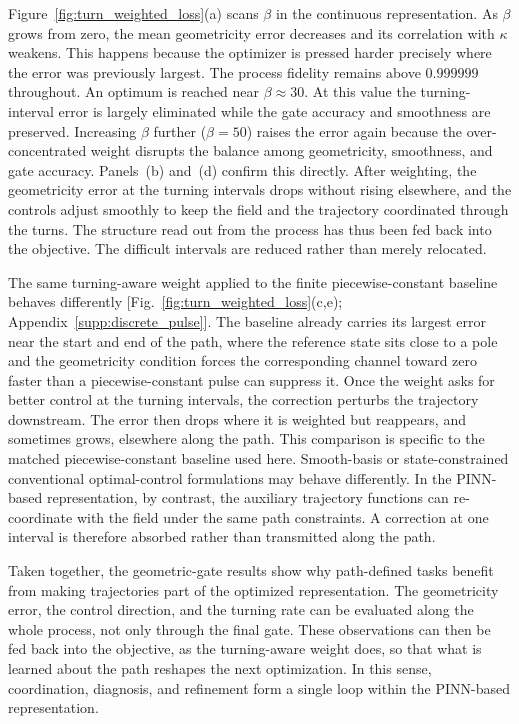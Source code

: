 \documentclass[aps,prx,reprint,superscriptaddress,nofootinbib,longbibliography,floatfix,showkeys]{revtex4-2}
\newcommand{\appsecref}[1]{Appendix~\hyperref[#1]{\ref*{#1}}}
\begin{document}
Figure~\ref{fig:turn_weighted_loss}(a) scans $\beta$ in the continuous
representation.  As $\beta$ grows from zero, the mean geometricity error
decreases and its correlation with $\kappa$ weakens.  This happens because
the optimizer is pressed harder precisely where the error was previously
largest.  The process fidelity remains above $0.999999$ throughout.  An
optimum is reached near $\beta\approx 30$.  At this value the
turning-interval error is largely eliminated while the gate accuracy and
smoothness are preserved.  Increasing $\beta$ further ($\beta=50$) raises
the error again because the over-concentrated weight disrupts the balance
among geometricity, smoothness, and gate accuracy.  Panels~(b) and~(d)
confirm this directly.  After weighting, the geometricity error at the
turning intervals drops without rising elsewhere, and the controls adjust
smoothly to keep the field and the trajectory coordinated through the
turns.  The structure read out from the process has thus been fed back into
the objective.  The difficult intervals are reduced rather than merely
relocated.

The same turning-aware weight applied to the finite piecewise-constant
baseline behaves differently [Fig.~\ref{fig:turn_weighted_loss}(c,e);
\appsecref{supp:discrete_pulse}].  The
baseline already carries its largest error near the start and end of the
path, where the reference state sits close to a pole and the geometricity
condition forces the corresponding channel toward zero faster than a
piecewise-constant pulse can suppress it.  Once the weight asks for better
control at the turning intervals, the correction perturbs the trajectory
downstream.  The error then drops where it is weighted but reappears, and
sometimes grows, elsewhere along the path.  This comparison is specific to
the matched piecewise-constant baseline used here.  Smooth-basis or
state-constrained conventional optimal-control formulations may behave
differently.  In the PINN-based representation, by contrast, the auxiliary
trajectory functions can re-coordinate with the field under the same path
constraints.  A correction at one interval is therefore absorbed rather than
transmitted along the path.

Taken together, the geometric-gate results show why path-defined tasks
benefit from making trajectories part of the optimized representation.  The
geometricity error, the control direction, and the turning rate can be
evaluated along the whole process, not only through the final gate.  These
observations can then be fed back into the objective, as the turning-aware
weight does, so that what is learned about the path reshapes the next
optimization.  In this sense, coordination, diagnosis, and refinement form a
single loop within the PINN-based representation.
\end{document}
